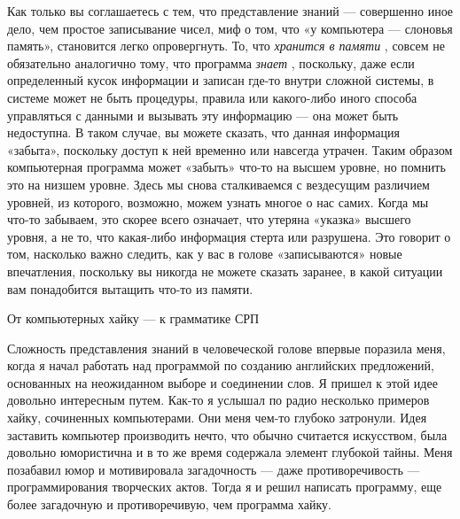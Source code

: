 \documentclass[../main.tex]{subfiles}
\begin{document}
Как только вы соглашаетесь с тем, что представление знаний --- совершенно иное дело, чем простое записывание чисел, миф о том, что «у компьютера --- слоновья память», становится легко опровергнуть. То, что \emph{хранится в памяти} , совсем не обязательно аналогично тому, что программа \emph{знает} , поскольку, даже если определенный кусок информации и записан где-то внутри сложной системы, в системе может не быть процедуры, правила или какого-либо иного способа управляться с данными и вызывать эту информацию --- она может быть недоступна. В таком случае, вы можете сказать, что данная информация «забыта», поскольку доступ к ней временно или навсегда утрачен. Таким образом компьютерная программа может «забыть» что-то на высшем уровне, но помнить это на низшем уровне. Здесь мы снова сталкиваемся с вездесущим различием уровней, из которого, возможно, можем узнать многое о нас самих. Когда мы что-то забываем, это скорее всего означает, что утеряна «указка» высшего уровня, а не то, что какая-либо информация стерта или разрушена. Это говорит о том, насколько важно следить, как у вас в голове «записываются» новые впечатления, поскольку вы никогда не можете сказать заранее, в какой ситуации вам понадобится вытащить что-то из памяти.

От компьютерных хайку --- к грамматике СРП

Сложность представления знаний в человеческой голове впервые поразила меня, когда я начал работать над программой по созданию английских предложений, основанных на неожиданном выборе и соединении слов. Я пришел к этой идее довольно интересным путем. Как-то я услышал по радио несколько примеров хайку, сочиненных компьютерами. Они меня чем-то глубоко затронули. Идея заставить компьютер производить нечто, что обычно считается искусством, была довольно юмористична и в то же время содержала элемент глубокой тайны. Меня позабавил юмор и мотивировала загадочность --- даже противоречивость --- программирования творческих актов. Тогда я и решил написать программу, еще более загадочную и противоречивую, чем программа хайку.
\end{document}
